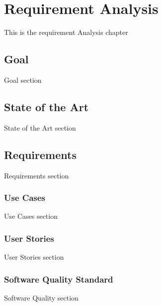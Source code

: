 \chapter{Requirement Analysis}

This is the requirement Analysis chapter 

\section{Goal}
Goal section

\section{State of the Art}
State of the Art section

\section{Requirements}
Requirements section

\subsection{Use Cases}
Use Cases section

\subsection{User Stories}
User Stories section

\subsection{Software Quality Standard}
Software Quality section